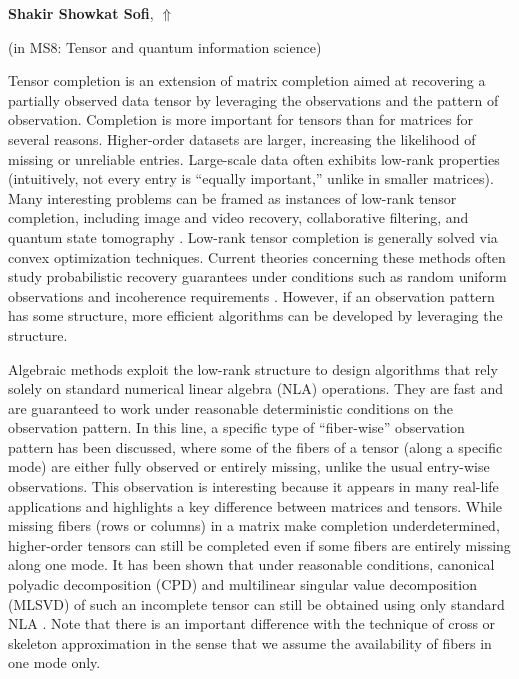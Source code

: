\documentclass[ILAS2025-program.tex]{subfiles}
\begin{document}
\hypertarget{down0020}{}\begin{ilasabstract}
    
\textbf{Shakir Showkat Sofi},  \hfill \hyperlink{up0020}{$\Uparrow$}
    
    
(in {\color{mstitle}MS8: Tensor and quantum information science})
        
\mtskip
    \begin{bibunit}
        Tensor completion is an extension of matrix completion aimed at recovering a partially observed data tensor by leveraging the observations and the pattern of observation. Completion is more important for tensors than for matrices for several reasons. Higher-order datasets are larger, increasing the likelihood of missing or unreliable entries. Large-scale data often exhibits low-rank properties (intuitively, not every entry is ``equally important,'' unlike in smaller matrices). Many interesting problems can be framed as instances of low-rank tensor completion, including image and video recovery, collaborative filtering, and quantum state tomography \cite{liu2013tc, gross2010quantum}. Low-rank tensor completion is generally solved via convex optimization techniques. Current theories concerning these methods often study probabilistic recovery guarantees under conditions such as random uniform observations and incoherence requirements \cite{candes2009exact, liu2013tc}. However, if an observation pattern has some structure, more efficient algorithms can be developed by leveraging the structure.\par

Algebraic methods exploit the low-rank structure to design algorithms that rely solely on standard numerical linear algebra (NLA) operations. They are fast and are guaranteed to work under reasonable deterministic conditions on the observation pattern. In this line, a specific type of ``fiber-wise'' observation pattern has been discussed, where some of the fibers of a tensor (along a specific mode) are either fully observed or entirely missing, unlike the usual entry-wise observations. This observation is interesting because it appears in many real-life applications and highlights a key difference between matrices and tensors. While missing fibers (rows or columns) in a matrix make completion underdetermined, higher-order tensors can still be completed even if some fibers are entirely missing along one mode. It has been shown that under reasonable conditions, canonical polyadic decomposition (CPD) and multilinear singular value decomposition (MLSVD) of such an incomplete tensor can still be obtained using only standard NLA \cite{mikael2019fibersamp, stijn2023mlsvdfsj}. Note that there is an important difference with the technique of cross or skeleton approximation in the sense that we assume the availability of fibers in one mode only. \par


\end{bibunit}
\end{ilasabstract}
\end{document}
